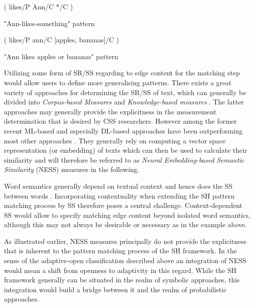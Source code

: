 \documentclass[11pt]{scrreprt}
\let\cite\parencite  %
\begin{document}
\begin{pattern}[h!]
  \normalfont\sffamily
  \centering
  ( likes/P Ann/C */C )
  \caption{"Ann-likes-something" pattern}
  \label{pat:ann-likes-something}
\end{pattern}

\begin{pattern}[h!]
  \normalfont\sffamily
  \centering
  ( likes/P ann/C [apples, bananas]/C )
  \caption{"Ann likes apples or bananas" pattern}
  \label{pat:ann-likes-apples-and-bananas}
\end{pattern}



Utilizing some form of SR/SS regarding to edge content for the matching step would allow users to define more generalising patterns. There exists a great variety of approaches for determining the SR/SS of text, which can generally be divided into \textit{Corpus-based Measures} and \textit{Knowledge-based measures} \cite[Section~1.3.2]{harispeSemanticSimilarityNatural2015}. The latter approaches may generally provide the explicitness in the measurement determination that is desired by CSS researchers. However among the former recent ML-based and especially DL-based approaches have been outperforming most other approaches \cite{chandrasekaranEvolutionSemanticSimilarity2021}. They generally rely on computing a vector space representation (or embedding) of texts which can then be used to calculate their similarity and will therefore be referred to as \textit{Neural Embedding-based Semantic Similarity} (NESS) measures in the following. 

Word semantics generally depend on textual context and hence does the SS between words \cite[Section~2.2.3]{harispeSemanticSimilarityNatural2015}. Incorporating contextuality when extending the SH pattern matching process by SS therefore poses a central challenge. Context-dependent SS would allow to specify matching edge content beyond isolated word semantics, although this may not always be desirable or necessary as in the example above. 

As illustrated earlier, NESS measures principally do not provide the explicitness that is inherent to the pattern matching process of the SH framework. In the sense of the adaptive-open classification described above an integration of NESS would mean a shift from openness to adaptivity in this regard. While the SH framework generally can be situated in the realm of symbolic approaches, this integration would build a bridge between it and the realm of probabilistic approaches.
\end{document}
